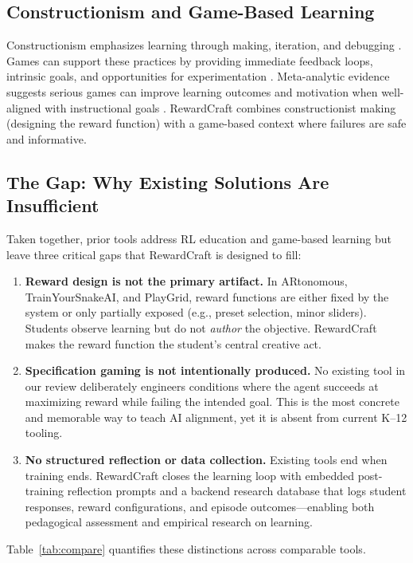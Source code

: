 \documentclass[conference]{IEEEtran}
\begin{document}
\subsection{Constructionism and Game-Based Learning}
Constructionism emphasizes learning through making, iteration, and debugging \cite{papert1980,kafai2014}. Games can support these practices by providing immediate feedback loops, intrinsic goals, and opportunities for experimentation \cite{gee2003,squire2011}. Meta-analytic evidence suggests serious games can improve learning outcomes and motivation when well-aligned with instructional goals \cite{wouters2013}. RewardCraft combines constructionist making (designing the reward function) with a game-based context where failures are safe and informative.

\subsection{The Gap: Why Existing Solutions Are Insufficient}
Taken together, prior tools address RL education and game-based learning but leave three critical gaps that RewardCraft is designed to fill:

\begin{enumerate}
  \item \textbf{Reward design is not the primary artifact.} In ARtonomous, TrainYourSnakeAI, and PlayGrid, reward functions are either fixed by the system or only partially exposed (e.g., preset selection, minor sliders). Students observe learning but do not \emph{author} the objective. RewardCraft makes the reward function the student's central creative act.
  \item \textbf{Specification gaming is not intentionally produced.} No existing tool in our review deliberately engineers conditions where the agent succeeds at maximizing reward while failing the intended goal. This is the most concrete and memorable way to teach AI alignment, yet it is absent from current K--12 tooling.
  \item \textbf{No structured reflection or data collection.} Existing tools end when training ends. RewardCraft closes the learning loop with embedded post-training reflection prompts and a backend research database that logs student responses, reward configurations, and episode outcomes---enabling both pedagogical assessment and empirical research on learning.
\end{enumerate}

\noindent Table~\ref{tab:compare} quantifies these distinctions across comparable tools.
\end{document}
